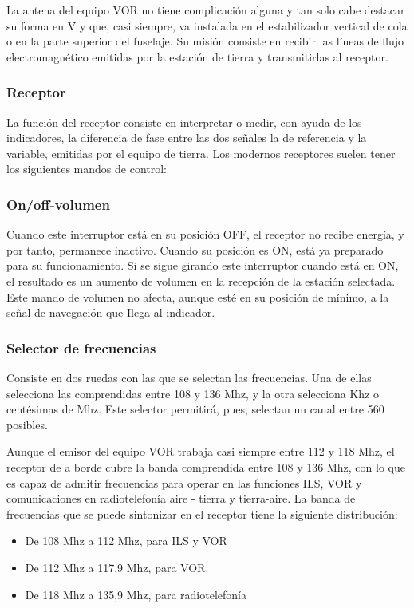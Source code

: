 La antena del equipo VOR no tiene complicación alguna y tan solo cabe destacar su forma en V y que, casi siempre, va instalada en el estabilizador vertical de cola o en la parte superior del fuselaje. Su misión consiste en recibir las líneas de flujo electromagnético emitidas por la estación de tierra y transmitirlas al receptor.

\subsubsection{Receptor }

La función del receptor consiste en interpretar o medir, con ayuda de los indicadores, la diferencia de fase entre las dos señales la de referencia y la  variable, emitidas por el equipo de tierra. Los modernos receptores suelen tener los siguientes mandos de control:

\subsubsection{On/off-volumen}
Cuando este interruptor está en su posición OFF, el receptor no recibe energía, y  por tanto, permanece inactivo. Cuando su posición es ON, está ya preparado para su funcionamiento. Si se sigue girando este interruptor cuando está en ON, el  resultado es un aumento de volumen en la recepción de la estación selectada. Este mando de volumen no afecta, aunque esté en su posición de mínimo, a la señal de navegación que Ilega al indicador.

\subsubsection{Selector de frecuencias}
Consiste en dos ruedas con las que se selectan las frecuencias. Una de ellas selecciona las comprendidas entre 108 y 136 Mhz, y la otra selecciona Khz o centésimas de Mhz. Este selector permitirá, pues, selectan un canal entre 560 posibles.

Aunque el emisor del equipo VOR trabaja casi siempre entre 112 y 118 Mhz, el receptor de a borde cubre la banda comprendida entre 108 y 136 Mhz, con lo que es capaz de admitir frecuencias para operar en las funciones ILS, VOR y comunicaciones en radiotelefonía aire - tierra y tierra-aire. La banda de frecuencias que se puede sintonizar en el receptor tiene la siguiente distribución:

\begin{itemize}
\item De 108 Mhz a 112 Mhz, para ILS y VOR 

\item De 112 Mhz a 117,9 Mhz, para VOR.

\item De 118 Mhz a 135,9 Mhz, para radiotelefonía

\end{itemize}

